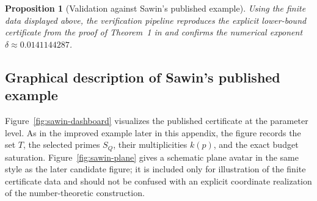 \documentclass[a4paper,12pt]{article}
\newtheorem{proposition}{Proposition}
\begin{document}
\begin{proposition}[Validation against Sawin's published example]
Using the finite data displayed above, the verification pipeline reproduces the explicit lower-bound certificate from the proof of Theorem~1 in \cite{Sawin2026} and confirms the numerical exponent $\delta\approx 0.0141144287$.
\end{proposition}

\subsection*{Graphical description of Sawin's published example}

Figure~\ref{fig:sawin-dashboard} visualizes the published certificate at the parameter level.  As in the improved example later in this appendix, the figure records the set $T$, the selected primes $S_Q$, their multiplicities $k(p)$, and the exact budget saturation.  Figure~\ref{fig:sawin-plane} gives a schematic plane avatar in the same style as the later candidate figure; it is included only for illustration of the finite certificate data and should not be confused with an explicit coordinate realization of the number-theoretic construction.
\end{document}
